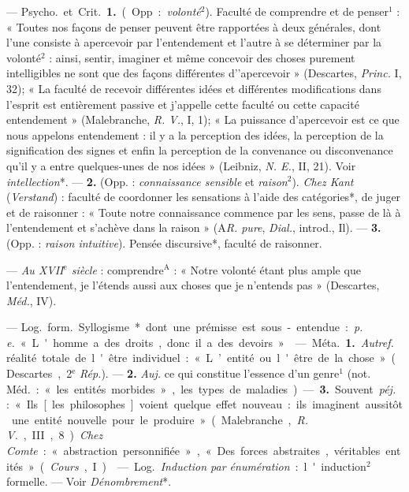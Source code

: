 \begin{itemize}[leftmargin=1cm, label=, itemsep=1pt]
 — \si{Psycho.} et \si{Crit.} {\bf 1.}
(Opp. : {\it volonté}$^2$). Faculté de comprendre et de penser$^1$ :
« Toutes nos
façons de penser peuvent être rapportées à deux générales, dont l’une
consiste à apercevoir par l’entendement et l’autre à se déterminer par
la volonté$^2$ : ainsi, sentir, imaginer
et même concevoir des choses purement intelligibles ne sont que des
façons différentes d’'apercevoir »
(Descartes, {\it Princ.} I, 32); « La
faculté de recevoir différentes idées
et différentes modifications dans
l'esprit est entièrement passive et
j'appelle cette faculté ou cette capacité entendement » (Malebranche,
{\it R. V.}, I, 1); « La puissance d’apercevoir est ce que nous appelons
entendement : il y a la perception
des idées, la perception de la signification des signes et enfin la perception de la convenance ou disconvenance qu'il y a entre quelques-unes de nos idées » (Leibniz, {\it N. E.},
II, 21). Voir {\it intellection}*. — {\bf 2.}
(Opp. : {\it connaissance sensible} et
{\it raison}$^2$). {\it Chez Kant} ({\it Verstand}) :
faculté de coordonner les sensations à l’aide des catégories*, de
juger et de raisonner : « Toute notre
connaissance commence par les sens,
passe de là à l’entendement et
s'achève dans la raison » (A{\it R. pure},
{\it Dial.}, introd., Il). — {\bf 3.} (Opp. :
{\it raison intuitive}). Pensée discursive*,
faculté de raisonner.

 — {\it Au XVII$^\text{e}$ siècle} : comprendre$^\text{A}$ :
« Notre volonté étant plus ample que l’entendement, je l’étends
aussi aux choses que je n'entends pas » (Descartes, {\it Méd.}, IV).

 — \si{Log.} \si{form.} Syllogisme* dont une prémisse est
sous-entendue : {\it p. e.} « L'homme a des droits, donc il a des devoirs ».

 — \si{Méta.} {\bf 1.} {\it Autref.} réalité
totale de l'être individuel : « L’entité ou l'être de la chose » (Descartes, 2$^\text{e}$ {\it Rép.}). — {\bf 2.} {\it Auj.} ce qui
constitue l’essence d’un genre$^1$ (not.
\si{Méd.} : « les entités morbides », les
types de maladies). — {\bf 3.} Souvent
 {\it péj.} : « Ils [les philosophes] voient
quelque effet nouveau : ils imaginent aussitôt une entité nouvelle
pour le produire » (Malebranche, {\it R. V.}, III, 8). {\it Chez Comte} :
« abstraction personnifiée », « Des forces abstraites, véritables entités »
({\it Cours}, I).

 — \si{Log.} {\it Induction par énumération} :
l'induction$^2$ formelle. — Voir {\it Dénombrement}*.


\end{itemize}
